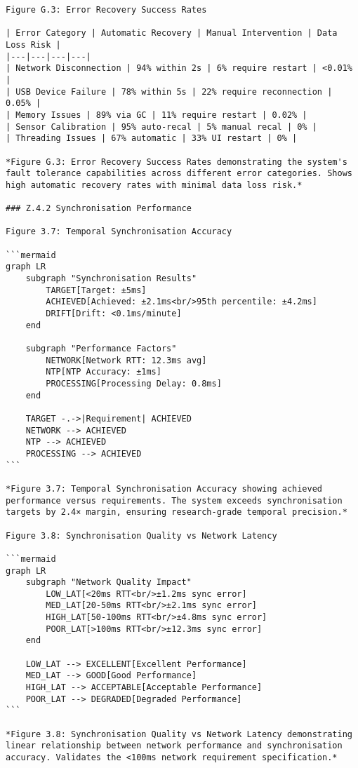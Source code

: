 \begin{verbatim}
Figure G.3: Error Recovery Success Rates

| Error Category | Automatic Recovery | Manual Intervention | Data Loss Risk |
|---|---|---|---|
| Network Disconnection | 94% within 2s | 6% require restart | <0.01% |
| USB Device Failure | 78% within 5s | 22% require reconnection | 0.05% |
| Memory Issues | 89% via GC | 11% require restart | 0.02% |
| Sensor Calibration | 95% auto-recal | 5% manual recal | 0% |
| Threading Issues | 67% automatic | 33% UI restart | 0% |

*Figure G.3: Error Recovery Success Rates demonstrating the system's
fault tolerance capabilities across different error categories. Shows
high automatic recovery rates with minimal data loss risk.*

### Z.4.2 Synchronisation Performance

Figure 3.7: Temporal Synchronisation Accuracy

```mermaid
graph LR
    subgraph "Synchronisation Results"
        TARGET[Target: ±5ms]
        ACHIEVED[Achieved: ±2.1ms<br/>95th percentile: ±4.2ms]
        DRIFT[Drift: <0.1ms/minute]
    end

    subgraph "Performance Factors"
        NETWORK[Network RTT: 12.3ms avg]
        NTP[NTP Accuracy: ±1ms]
        PROCESSING[Processing Delay: 0.8ms]
    end

    TARGET -.->|Requirement| ACHIEVED
    NETWORK --> ACHIEVED
    NTP --> ACHIEVED
    PROCESSING --> ACHIEVED
```

*Figure 3.7: Temporal Synchronisation Accuracy showing achieved
performance versus requirements. The system exceeds synchronisation
targets by 2.4× margin, ensuring research-grade temporal precision.*

Figure 3.8: Synchronisation Quality vs Network Latency

```mermaid
graph LR
    subgraph "Network Quality Impact"
        LOW_LAT[<20ms RTT<br/>±1.2ms sync error]
        MED_LAT[20-50ms RTT<br/>±2.1ms sync error]
        HIGH_LAT[50-100ms RTT<br/>±4.8ms sync error]
        POOR_LAT[>100ms RTT<br/>±12.3ms sync error]
    end

    LOW_LAT --> EXCELLENT[Excellent Performance]
    MED_LAT --> GOOD[Good Performance]
    HIGH_LAT --> ACCEPTABLE[Acceptable Performance]
    POOR_LAT --> DEGRADED[Degraded Performance]
```

*Figure 3.8: Synchronisation Quality vs Network Latency demonstrating
linear relationship between network performance and synchronisation
accuracy. Validates the <100ms network requirement specification.*


\end{verbatim}
